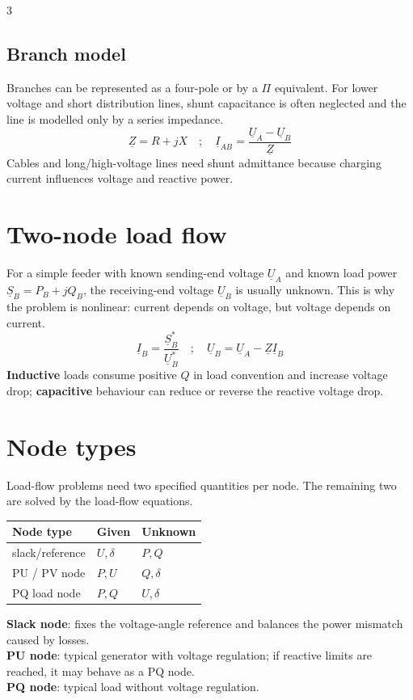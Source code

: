 \documentclass[9pt, landscape, a4paper]{article}
\begin{document}
\begin{multicols*}{3}
\subsection{Branch model}
Branches can be represented as a four-pole or by a $\Pi$ equivalent. For lower
voltage and short distribution lines, shunt capacitance is often neglected and
the line is modelled only by a series impedance.
\[
  \underline Z=R+jX
  \quad ; \quad
  \underline I_{AB}=\frac{\underline U_A-\underline U_B}{\underline Z}
\]
Cables and long/high-voltage lines need shunt admittance because charging
current influences voltage and reactive power.

\section{Two-node load flow}
For a simple feeder with known sending-end voltage $\underline U_A$ and known
load power $\underline S_B=P_B+jQ_B$, the receiving-end voltage
$\underline U_B$ is usually unknown. This is why the problem is nonlinear:
current depends on voltage, but voltage depends on current.
\[
  \underline I_B=\frac{\underline S_B^*}{\underline U_B^*}
  \quad ; \quad
  \underline U_B=\underline U_A-\underline Z\underline I_B
\]
\textbf{Inductive} loads consume positive $Q$ in load convention and increase voltage
drop; \textbf{capacitive} behaviour can reduce or reverse the reactive voltage drop.

\section{Node types}
Load-flow problems need two specified quantities per node. The remaining two
are solved by the load-flow equations.

\begin{tabularx}{\columnwidth}{@{}lXX@{}}
  \toprule
  \textbf{Node type} & \textbf{Given} & \textbf{Unknown}\\
  \midrule
  slack/reference & $U,\delta$ & $P,Q$\\
  PU / PV node & $P,U$ & $Q,\delta$\\
  PQ load node & $P,Q$ & $U,\delta$\\
  \bottomrule
\end{tabularx}

\textbf{Slack node}: fixes the voltage-angle reference and balances the power
mismatch caused by losses.\\
\textbf{PU node}: typical generator with voltage
regulation; if reactive limits are reached, it may behave as a PQ node.\\
\textbf{PQ node}: typical load without voltage regulation.


\end{multicols*}
\end{document}
